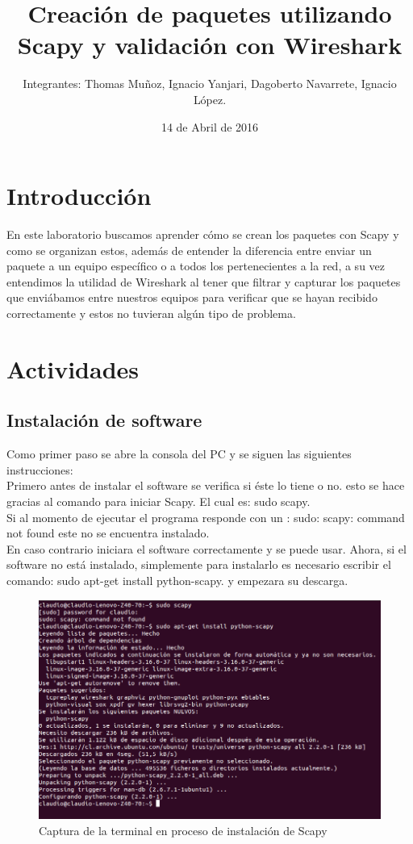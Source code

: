 \documentclass{udpreport}
\title{Creación de paquetes utilizando Scapy y validación con Wireshark}
\author{Integrantes: Thomas Muñoz, Ignacio Yanjari, Dagoberto Navarrete, Ignacio López.}
\date{14 de Abril de 2016}
\begin{document}
\maketitle
\tableofcontents
\chapter{Introducción}
	En este laboratorio buscamos aprender cómo se crean los paquetes con Scapy y como se organizan estos, además de entender la
	diferencia entre enviar un paquete a un equipo específico o a todos los pertenecientes a la red, a su vez entendimos la
	utilidad de Wireshark al tener que filtrar y capturar los paquetes que enviábamos entre nuestros equipos para verificar que se
	hayan recibido correctamente y estos no tuvieran algún tipo de problema.
\chapter{Actividades}
	\section{Instalación de software}
	Como primer paso se abre la consola del PC y se siguen las siguientes instrucciones:\\
	Primero antes de instalar el software se  verifica si éste lo tiene o no.
	esto se hace gracias al comando para iniciar Scapy. El cual es: sudo scapy.\\
	Si al momento de ejecutar el programa responde con un :  sudo: scapy: command not found 
	este no se encuentra instalado. \\
	En caso contrario iniciara el software correctamente y se puede usar.
	Ahora, si el software no está instalado, simplemente para instalarlo
	es necesario escribir el comando: sudo apt-get install python-scapy.
	y empezara su descarga.\\
	\begin{figure}[h]
	\centering
	\includegraphics[width=\textwidth]{Instalacion.png}
	\caption{Captura de la terminal en proceso de instalación de Scapy}
	\end{figure}\\
\end{document}
